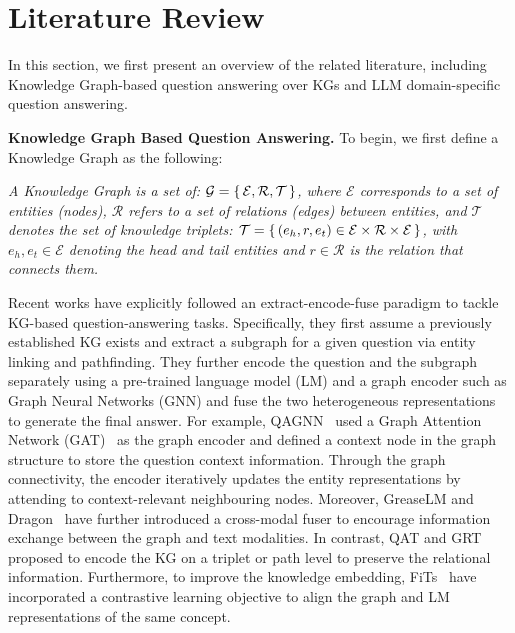 \section*{Literature Review}

In this section, we first present an overview of the related literature, including Knowledge Graph-based question answering over KGs and LLM domain-specific question answering.

\textbf{Knowledge Graph Based Question Answering. }
To begin, we first define a Knowledge Graph as the following:
\begin{definition}
    \emph{A Knowledge Graph is a set of: $\mathcal G = \set{\mathcal E, \mathcal R, \mathcal T}$, where $\mathcal E$ corresponds to a set of entities (nodes),
    $\mathcal R$ refers to a set of relations (edges) between entities,
    and $\mathcal T$ denotes the set of knowledge triplets: $\mathcal T = \set{(e_h,r,e_t)\in \mathcal E\times \mathcal R\times \mathcal E}$, with $e_h, e_t \in \mathcal E$ denoting the head and tail entities
    and $r\in\mathcal R$ is the relation that connects them.}
\end{definition}

Recent works have explicitly followed an extract-encode-fuse paradigm to tackle KG-based question-answering tasks.
Specifically, they first assume a previously established KG exists and extract a subgraph for a given question via entity linking and pathfinding. 
They further encode the question and the subgraph separately using a pre-trained language model (LM) and a graph encoder such as Graph Neural Networks (GNN) and fuse the two heterogeneous representations to generate the final answer.
For example, QAGNN~\parencite{qagnn} used a Graph Attention Network (GAT)~\parencite{gat} as the graph encoder and defined a context node in the graph structure to store the question context information. 
Through the graph connectivity, the encoder iteratively updates the entity representations by attending to context-relevant neighbouring nodes.
Moreover, GreaseLM and Dragon~\parencite{greaselm, dragon} have further introduced a cross-modal fuser to encourage information exchange between the graph and text modalities. 
In contrast, QAT and GRT~\parencite{qat, grt} proposed to encode the KG on a triplet or path level to preserve the relational information.
Furthermore, to improve the knowledge embedding, FiTs~\parencite{fits} have incorporated a contrastive learning objective to align the graph and LM representations of the same concept. 

